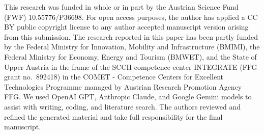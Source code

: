 \documentclass[manuscript,screen,review]{acmart}
\begin{document}




\begin{acks}
This research was funded in whole or in part by the Austrian Science Fund (FWF) 10.55776/P36698. For open access purposes, the author has applied a CC BY public copyright license to any author accepted manuscript version arising from this submission.
The research reported in this paper has been partly funded by the Federal Ministry for Innovation, Mobility and Infrastructure (BMIMI), the Federal Ministry for Economy, Energy and Tourism (BMWET), and the State of Upper Austria in the frame of the SCCH competence center INTEGRATE (FFG grant no.~892418) in the COMET - Competence Centers for Excellent Technologies Programme managed by Austrian Research Promotion Agency FFG.
We used OpenAI GPT, Anthropic Claude, and Google Gemini models to assist with writing, coding, and literature search. The authors reviewed and refined the generated material and take full responsibility for the final manuscript.
\end{acks}



\end{document}
